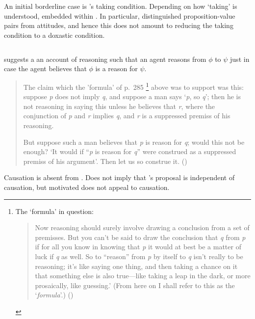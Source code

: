 \begin{note}
  An initial borderline case is \citeauthor{Boghossian:2014aa}'s taking condition.
  Depending on how `taking' is understood, embedded within \ros{}.
  In particular, distinguished proposition-value pairs from attitudes, and hence this does not amount to reducing the taking condition to a doxastic condition.
\end{note}

\subsection{\textcite{Thomson:1965vv}}

\begin{note}
  \citeauthor{Thomson:1965vv} suggests a an account of reasoning such that an agent reasons from \(\phi\) to \(\psi\) just in case the agent believes that \(\phi\) is a reason for \(\psi\).
  \begin{quote}
    The claim which the 'formula' of p.\ 285\nolinebreak
    \footnote{
      The `formula' in question:
      \begin{quote}
        Now reasoning should surely involve drawing a conclusion from a set of premisses.
        But you can't be said to draw the conclusion that \emph{q} from \emph{p} if for all you know in knowing that \emph{p} it would at best be a matter of luck if \emph{q} as well.
        So to ``reason'' from \emph{p} by itself to \emph{q} isn't really to be reasoning; it's like saying one thing, and then taking a chance on it that something else is also true---like taking a leap in the dark, or more prosaically, like guessing.'
        (From here on I shall refer to this as the `\emph{formula}'.)\nolinebreak
        \mbox{}\hfill\mbox{(\citeyear[285]{Thomson:1965vv})}
      \end{quote}
    }
    above was to support was this:
    suppose \emph{p} does not imply \emph{q}, and suppose a man says `\emph{p}, so \emph{q}';
    then he is not reasoning in saying this unless he believes that \emph{r}, where the conjunction of \emph{p} and \emph{r} implies \emph{q}, and \emph{r} is a suppressed premiss of his reasoning.\par
    But suppose such a man believes that \emph{p} is reason for \emph{q}; would this not be enough?
    `It would if ``\emph{p} is reason for \emph{q}'' were construed as a suppressed premiss of his argument'.
    Then let us so construe it.\newline
    \mbox{}\hfill\mbox{(\citeyear[294]{Thomson:1965vv})}
  \end{quote}
  Causation is absent from \citeauthor{Thomson:1965vv}.
  Does not imply that \citeauthor{Thomson:1965vv}'s proposal is independent of causation, but motivated does not appeal to causation.
\end{note}

